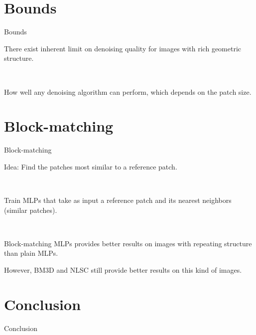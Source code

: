\documentclass[8pt]{beamer}
\begin{document}
\section{Bounds}

\begin{frame}{Bounds}


\begin{mybox}
There exist inherent limit on denoising quality for images with rich geometric structure.
\end{mybox}\

\begin{mybox}
How well any denoising algorithm can perform, which depends on the patch size.
\end{mybox}

\end{frame}

\section{Block-matching}
\begin{frame}{Block-matching}
\begin{mybox}
Idea: Find the patches most similar to a reference patch.
\end{mybox}\

\begin{mybox}
Train MLPs that take as input a reference patch and its nearest neighbors (similar patches).
\end{mybox}\

\begin{mybox}[Results]
Block-matching MLPs provides better results on images with repeating structure than plain MLPs.

\vspace{0.5em}
However, BM3D and NLSC still provide better results on this kind of images.
\end{mybox}
\end{frame}






\section{Conclusion}

\begin{frame}{Conclusion}
\begin{block}{}

\end{block}
\end{frame}
\end{document}
